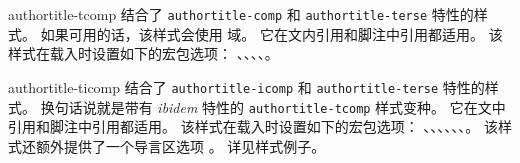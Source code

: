 \begin{marglist}
\item[authortitle-tcomp]
结合了 \texttt{authortitle-comp} 和 \texttt{authortitle-terse} 特性的样式。
如果可用的话，该样式会使用  域。
它在文内引用和脚注中引用都适用。
该样式在载入时设置如下的宏包选项：
、、、、。

\item[authortitle-ticomp]
结合了 \texttt{authortitle-icomp} 和 \texttt{authortitle-terse} 特性的样式。
换句话说就是带有 \emph{ibidem} 特性的 \texttt{authortitle-tcomp} 样式变种。
它在文中引用和脚注中引用都适用。
该样式在载入时设置如下的宏包选项：
、、、、、、。
该样式还额外提供了一个导言区选项 。
详见样式例子。


\end{marglist}
